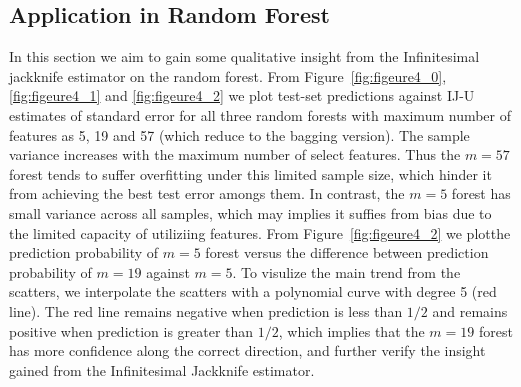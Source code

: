\documentclass[11pt]{article}
\begin{document}
\subsection{Application in Random Forest}
\label{sec:Figure4}
In this section we aim to gain some qualitative insight from the Infinitesimal jackknife estimator on the random forest.
From Figure~\ref{fig:figeure4_0}, \ref{fig:figeure4_1} and \ref{fig:figeure4_2} we plot test-set predictions against IJ-U estimates of standard error for all three random forests with maximum number of features as 5, 19 and 57 (which reduce to the bagging version).
The sample variance increases with the maximum number of select features.
Thus the $m=57$ forest tends to suffer overfitting under this limited sample size, which hinder it from achieving the best test error amongs them.
In contrast, the $m=5$ forest has small variance across all samples, which may implies it suffies from bias due to the limited capacity of utiliziing features.
From Figure~\ref{fig:figeure4_2} we plotthe prediction probability of $m=5$ forest versus the difference between prediction probability of $m=19$ against $m=5$.
To visulize the main trend from the scatters, we interpolate the scatters with a polynomial curve with degree 5 (red line).
The red line remains negative when prediction is less than $1/2$ and remains positive when prediction is greater than $1/2$, which implies that the $m=19$ forest has more confidence along the correct direction, and further verify the insight gained from the Infinitesimal Jackknife estimator.
\end{document}
